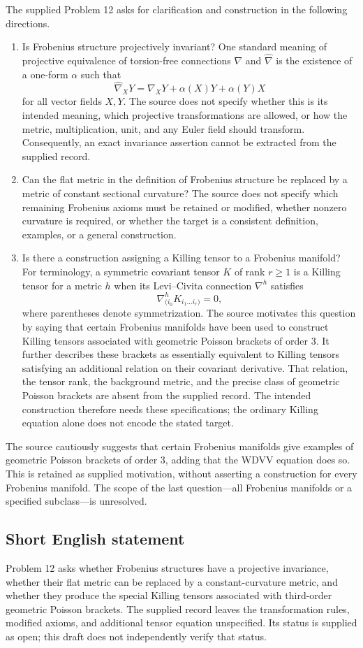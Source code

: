 \documentclass[11pt]{article}
\begin{document}
The supplied Problem 12 asks for clarification and construction in the following directions.
\begin{enumerate}
\item Is Frobenius structure projectively invariant? One standard meaning of projective equivalence of torsion-free connections \(\nabla\) and \(\widehat\nabla\) is the existence of a one-form \(\alpha\) such that
\[
 \widehat\nabla_XY=\nabla_XY+\alpha(X)Y+\alpha(Y)X
\]
for all vector fields \(X,Y\). The source does not specify whether this is its intended meaning, which projective transformations are allowed, or how the metric, multiplication, unit, and any Euler field should transform. Consequently, an exact invariance assertion cannot be extracted from the supplied record.
\item Can the flat metric in the definition of Frobenius structure be replaced by a metric of constant sectional curvature? The source does not specify which remaining Frobenius axioms must be retained or modified, whether nonzero curvature is required, or whether the target is a consistent definition, examples, or a general construction.
\item Is there a construction assigning a Killing tensor to a Frobenius manifold? For terminology, a symmetric covariant tensor \(K\) of rank \(r\geq 1\) is a Killing tensor for a metric \(h\) when its Levi--Civita connection \(\nabla^h\) satisfies
\[
 \nabla^h_{(i_0}K_{i_1\ldots i_r)}=0,
\]
where parentheses denote symmetrization. The source motivates this question by saying that certain Frobenius manifolds have been used to construct Killing tensors associated with geometric Poisson brackets of order \(3\). It further describes these brackets as essentially equivalent to Killing tensors satisfying an additional relation on their covariant derivative. That relation, the tensor rank, the background metric, and the precise class of geometric Poisson brackets are absent from the supplied record. The intended construction therefore needs these specifications; the ordinary Killing equation alone does not encode the stated target.
\end{enumerate}
The source cautiously suggests that certain Frobenius manifolds give examples of geometric Poisson brackets of order \(3\), adding that the WDVV equation does so. This is retained as supplied motivation, without asserting a construction for every Frobenius manifold. The scope of the last question---all Frobenius manifolds or a specified subclass---is unresolved.
\subsection{Short English statement}
Problem 12 asks whether Frobenius structures have a projective invariance, whether their flat metric can be replaced by a constant-curvature metric, and whether they produce the special Killing tensors associated with third-order geometric Poisson brackets. The supplied record leaves the transformation rules, modified axioms, and additional tensor equation unspecified. Its status is supplied as open; this draft does not independently verify that status.
\end{document}
